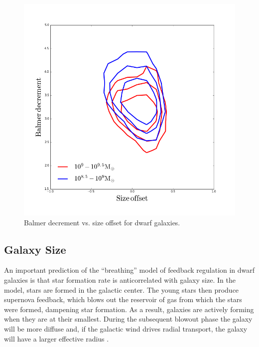 \documentclass[iop]{emulateapj}
\begin{document}
\begin{figure}
	\centering
	\includegraphics[width=1.5 \columnwidth]{BD_size.png}
	\caption{Balmer decrement vs. size offset for dwarf galaxies.}
     \label{fig:bdvsize}

\end{figure}


\subsection{Galaxy Size}

An important prediction of the ``breathing'' model of feedback regulation in dwarf galaxies is that star formation rate is anticorrelated with galaxy size. In the model, stars are formed in the galactic center. The young stars then produce supernova feedback, which blows out the reservoir of gas from which the stars were formed, dampening star formation. As a result, galaxies are actively forming when they are at their smallest. During the subsequent blowout phase the galaxy will be more diffuse and, if the galactic wind drives radial transport, the galaxy will have a larger effective radius \cite{EB17}. 
\end{document}
